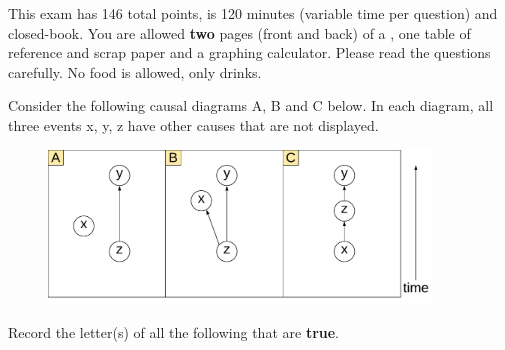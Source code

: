 \documentclass[12pt]{article}
\begin{document}
This exam has 146 total points, is 120 minutes (variable time per question) and closed-book. You are allowed \textbf{two} pages (front and back) of a , one table of reference and scrap paper and a graphing calculator. Please read the questions carefully. No food is allowed, only drinks. %

\pagebreak




\problem [10min] Consider the following causal diagrams A, B and C below. In each diagram, all three events x, y, z have other causes that are not displayed.


\begin{figure}[htp]
\centering
\includegraphics[width=4in]{basic_causal_diagrams}
\end{figure}

\vspace{-.8cm}
\benum

 Record the letter(s) of all the following that are \textbf{true}. 
\end{document}
